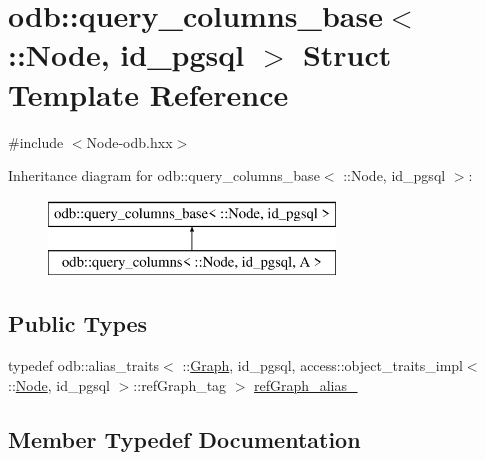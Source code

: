 \hypertarget{structodb_1_1query__columns__base_3_01_1_1_node_00_01id__pgsql_01_4}{}\section{odb\+:\+:query\+\_\+columns\+\_\+base$<$ \+:\+:Node, id\+\_\+pgsql $>$ Struct Template Reference}
\label{structodb_1_1query__columns__base_3_01_1_1_node_00_01id__pgsql_01_4}


{\ttfamily \#include $<$Node-\/odb.\+hxx$>$}

Inheritance diagram for odb\+:\+:query\+\_\+columns\+\_\+base$<$ \+:\+:Node, id\+\_\+pgsql $>$\+:\begin{figure}[H]
\begin{center}
\leavevmode
\includegraphics[height=2.000000cm]{d6/dc3/structodb_1_1query__columns__base_3_01_1_1_node_00_01id__pgsql_01_4}
\end{center}
\end{figure}
\subsection*{Public Types}
\begin{DoxyCompactItemize}
\item 
typedef odb\+::alias\+\_\+traits$<$ \+::\hyperlink{class_graph}{Graph}, id\+\_\+pgsql, access\+::object\+\_\+traits\+\_\+impl$<$ \+::\hyperlink{class_node}{Node}, id\+\_\+pgsql $>$\+::ref\+Graph\+\_\+tag $>$ \hyperlink{structodb_1_1query__columns__base_3_01_1_1_node_00_01id__pgsql_01_4_ab311bfd7c6def6fc3da77e3a2858ea38}{ref\+Graph\+\_\+alias\+\_\+}
\end{DoxyCompactItemize}


\subsection{Member Typedef Documentation}
\hypertarget{structodb_1_1query__columns__base_3_01_1_1_node_00_01id__pgsql_01_4_ab311bfd7c6def6fc3da77e3a2858ea38}{}
